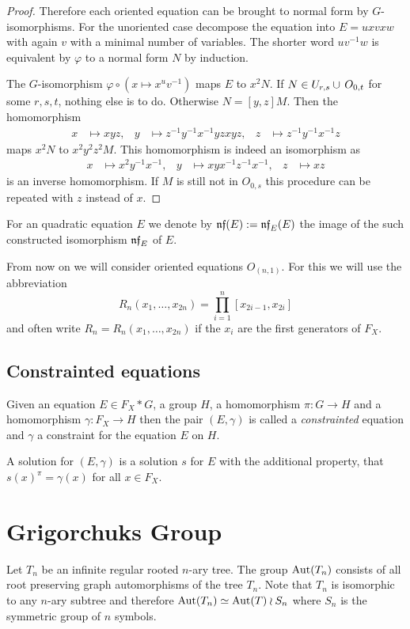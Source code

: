 \documentclass[a4paper,12pt]{article}
\begin{document}
\begin{proof}
 Therefore each oriented equation can be brought to normal form by $G$-iso\-morphisms. 
 For the unoriented case decompose the equation into $E = uxvxw$ with again $v$ with a minimal number of variables. 
 The shorter word $uv^{-1}w$ is equivalent by $\varphi$ to a normal form $N$ by induction.
 
 The $G$-isomorphism $\varphi \circ (x\mapsto x^uv^{-1})$ maps $E$ to $x^2N$. If $N\in U_{r,s}\cup\thinspace O_{0,t}$ for some $r,s,t$, nothing else is to do.
 Otherwise $N=[y,z]M$. Then the homomorphism
 \begin{align*}
  x&\mapsto xyz, & y&\mapsto z^{-1}y^{-1}x^{-1}yzxyz, & z&\mapsto z^{-1}y^{-1}x^{-1}z
 \end{align*}
maps $x^2N$ to $x^2y^2z^2M$. This homomorphism is indeed an isomorphism as 
\begin{align*}
  x&\mapsto x^2y^{-1}x^{-1}, & y&\mapsto xyx^{-1}z^{-1}x^{-1}, & z&\mapsto xz
 \end{align*}
 is an inverse homomorphism. If $M$ is still not in $O_{0,s}$ this procedure can be repeated with $z$ instead of $x$. 
\end{proof}
For an quadratic equation $E$ we denote by $\mathfrak{nf}(E) := \mathfrak{nf}_E(E)$ the image of the such constructed isomorphism $\mathfrak{nf}_E$ of $E$. 

From now on we will consider oriented equations $O_{(n,1)}$. For this we will use the abbreviation 
\[R_n(x_1,\ldots,x_{2n})=\prod_{i=1}^n [x_{2i-1},x_{2i}]\] and often write $R_n=R_n(x_1,\ldots,x_{2n})$ if the $x_i$ are the first generators of $F_X$. 

\subsection{Constrainted equations}
\begin{defi}
 Given an equation $E \in F_X*G$, a group $H$, a homomorphism $\pi\colon G \to H$ and a homomorphism $\gamma\colon F_X \to H$ then the pair $(E,\gamma)$ is called a \emph{constrainted} equation and $\gamma$ a constraint for the equation
 $E$ on $H$.
 
 A solution for $(E,\gamma)$ is a solution $s$ for $E$ with the additional property, that $s(x)^\pi = \gamma(x)$ for all $x\in F_X$.
\end{defi}

\section{Grigorchuks Group}
Let $T_n$ be an infinite regular rooted $n$-ary tree. The group $\textup{Aut}(T_n)$ consists of all root preserving graph automorphisms of the tree $T_n$. 
Note that $T_n$ is isomorphic to any $n$-ary subtree and therefore $\textup{Aut}(T_n)\simeq \textup{Aut}(T)\wr S_n$ where $S_n$ is the symmetric group of $n$ symbols. 
\end{document}
